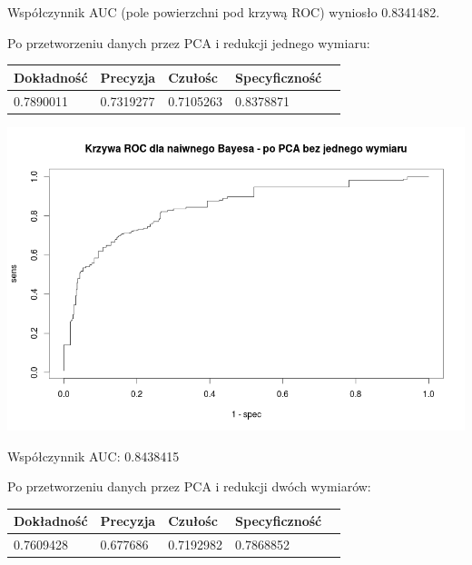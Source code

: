 \documentclass{article}
\begin{document}
Współczynnik AUC (pole powierzchni pod krzywą ROC) wyniosło 0.8341482.

Po przetworzeniu danych przez PCA i redukcji jednego wymiaru:

\begin{center}
    \begin{tabular}{| l | l | l | l | l|}
    \hline
        Dokładność &  Precyzja &  Czułośc & Specyficzność \\ \hline
      	0.7890011 & 0.7319277 & 0.7105263 & 0.8378871  \\
    \hline
    \end{tabular}
\end{center}

\begin{center}
	\includegraphics[scale=0.40]{images/bayes1.png}
\end{center}

Współczynnik AUC: 0.8438415

Po przetworzeniu danych przez PCA i redukcji dwóch wymiarów:

\begin{center}
    \begin{tabular}{| l | l | l | l | l|}
    \hline
        Dokładność &  Precyzja &  Czułośc & Specyficzność \\ \hline
      	0.7609428 & 0.677686 & 0.7192982 & 0.7868852  \\
    \hline
    \end{tabular}
\end{center}
\end{document}
